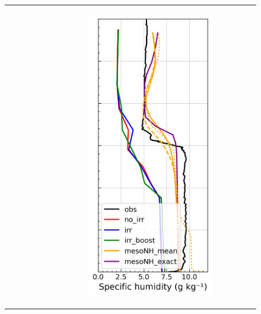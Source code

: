 \begin{figure}[hbtp]
{\begin{tabular}{@{}cccc@{}}
\begin{subfigure}[t]{0.285\textwidth}
        \end{subfigure} &
        \begin{subfigure}[t]{0.29\textwidth}
            \caption{}
            \includegraphics[width=\textwidth]{images/chap5/profiles/profile_elsplans_ovap_2007_sensbins.png}

\end{subfigure}
\end{tabular}}
\end{figure}
